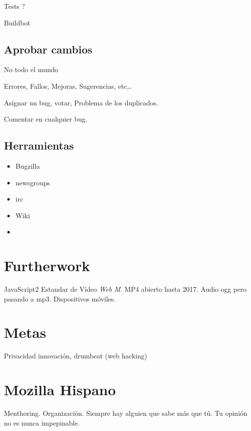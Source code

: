 \documentclass[11pt]{scrartcl}
\begin{document}
Tests ? 

Buildbot


\subsection{Aprobar cambios}
\label{sub:valid-commits}

No todo el mundo

Errores, Fallos, Mejoras, Sugerencias, etc\ldots

Asignar un bug, votar, Problema de los duplicados.

Comentar en cualquier bug.


\subsection{Herramientas}
\label{sub:tools}

\begin{itemize}
	\item Bugzilla
	\item newsgroups
	\item irc
	\item Wiki
	\item 
\end{itemize}

\section{Furtherwork}
\label{sec:furtherwork}

JavaScript2
Estandar de V\'ideo \emph{Web M}. MP4 abierto hasta 2017.
Audio ogg pero pasando a mp3.
Dispositivos m\'oviles.


\section{Metas}
\label{sec:goals}

Privacidad innovaci\'on, drumbeat (web hacking)


\section{Mozilla Hispano}
\label{sec:moz-hispano}

Menthoring.
Organizaci\'on.
Siempre hay alguien que sabe m\'as que t\'u.
Tu opini\'on no es nunca impepinable.

\end{document}
